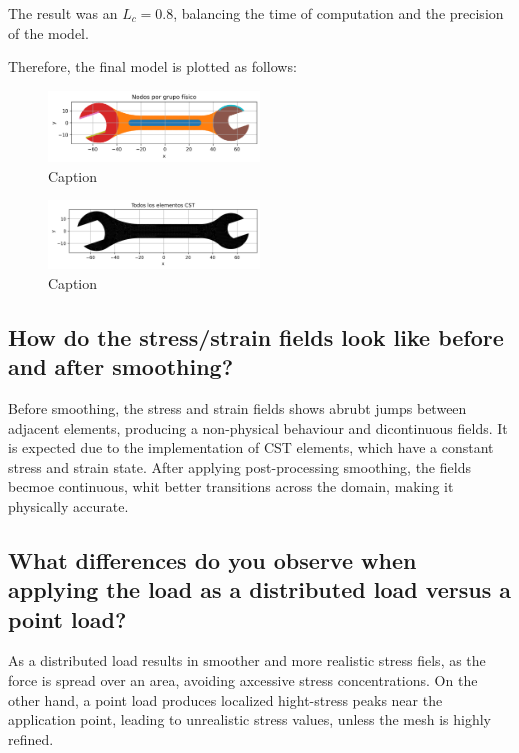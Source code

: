 The result was an $L_c = 0.8$, balancing the time of computation and the precision of the model.

Therefore, the final model is plotted as follows:
  
\begin{figure}[H]
\centering
\includegraphics[width=0.5\textwidth]{GRAFICOS/Case a_nodes_por_grupo.png}
\caption{Caption}
\label{fig:wrench}
\end{figure}
  
\begin{figure}[H]
\centering
\includegraphics[width=0.5\textwidth]{GRAFICOS/Case a_elementos.png}
\caption{Caption}
\label{fig:deformed_shape}
\end{figure}

\subsection{How do the stress/strain fields look like before and after smoothing?}

Before smoothing, the stress and strain fields shows abrubt jumps between adjacent elements, producing a non-physical behaviour and dicontinuous fields. It is expected due to the implementation of CST elements, which have a constant stress and strain state. After applying post-processing smoothing, the fields becmoe continuous, whit better transitions across the domain, making it physically accurate.

\subsection{What differences do you observe when applying the load as a distributed load versus a point load?}

As a distributed load results in smoother and more realistic stress fiels, as the force is spread over an area, avoiding axcessive stress concentrations. 
On the other hand, a point load produces localized hight-stress peaks near the application point, leading to unrealistic stress values, unless the mesh is highly refined.

